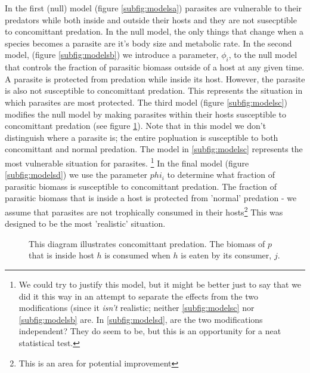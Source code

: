 \documentclass[11pt]{amsart}
\begin{document}
In the first (null) model (figure \ref{subfig:modelsa}) parasites are vulnerable to their predators while both inside and outside their hosts and they are not susecptible to concomittant predation.  In the null model, the only things that change when a species becomes a parasite are it's body size and metabolic rate.  In the second model, (figure \ref{subfig:modelsb})  we introduce a parameter, $\phi_i$, to the null model that controls the fraction of parasitic biomass outside of a host at any given time.  A parasite is protected from predation while inside its host.  However, the parasite is also not susceptible to concomittant predation.  This represents the situation in which parasites are most protected.  The third model (figure \ref{subfig:modelsc}) modifies the null model by making parasites within their hosts susceptible to concomittant predation (see figure \ref{fig:concDiagram}).  Note that in this model we don't distinguish where a parasite is; the entire popluation is susceptible to both concomittant and normal predation.  The model in \ref{subfig:modelsc} represents the most vulnerable situation for parasites. \footnote{We could try to justify this model, but it might be better just to say that we did it this way in an attempt to separate the effects from the two modifications (since it \textit{isn't} realistic; neither \ref{subfig:modelsc} nor \ref{subfig:modelsb} are. In \ref{subfig:modelsd}, are the two modifications independent?  They do seem to be, but this is an opportunity for a neat statistical test.}  In the final model (figure \ref{subfig:modelsd}) we use the parameter $phi_i$ to determine what fraction of parasitic biomass is susceptible to concomittant predation.  The fraction of parasitic biomass that is inside a host is protected from 'normal' predation - we assume that parasites are not trophically consumed in their hosts\footnote{This is an area for potential improvement}  This was designed to be the most 'realistic' situation.

\begin{figure}
\caption{This diagram illustrates concomittant predation.  The biomass of $p$ that is inside host $h$ is consumed when $h$ is eaten by its consumer, $j$. \label{fig:concDiagram}}
\end{figure}
\end{document}
